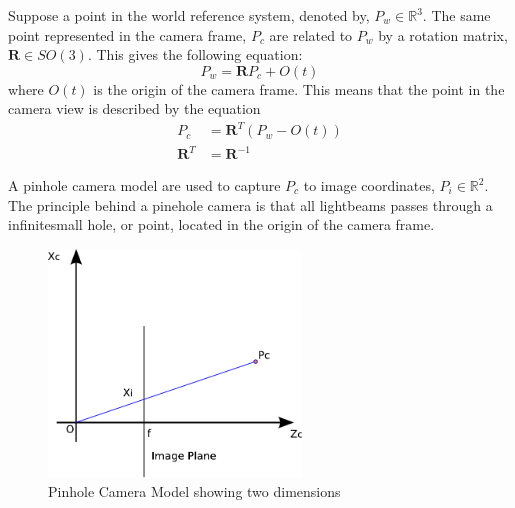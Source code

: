 	Suppose a point in the world reference system, denoted by, $P_w \in \mathbb{R}^3$. The same point
	represented in the camera frame, $P_c$ are related to $P_w$ by a rotation matrix, $\mathbf{R} \in
	SO(3)$. This gives the following equation: 
	\begin{equation}
		P_w = \mathbf{R} P_c + O(t)
	\end{equation}
	where $O(t)$ is the origin of the camera frame. This means that the point in the camera view is
	described by the equation
	\begin{equation}
		\label{eq:ch1-P_c}
		\begin{aligned}
			P_c &= \mathbf{R}^T (P_w - O(t)) \\
			\mathbf{R}^T &= \mathbf{R}^{-1} 
		\end{aligned}
	\end{equation}

	A pinhole camera model are used to capture $P_c$ to image coordinates, $P_i \in
	\mathbb{R}^2$. 
	The principle behind a pinehole camera is that all lightbeams passes through a
	infinitesmall hole, or point, located in the origin of the camera frame.   
	\begin{figure}[hbtp]
		\centering
		\includegraphics[width=0.6\textwidth]{pics/pinhole_model}
		\caption{Pinhole Camera Model showing two dimensions}
		\label{fig:ch1-pinhole}
	\end{figure}
			
